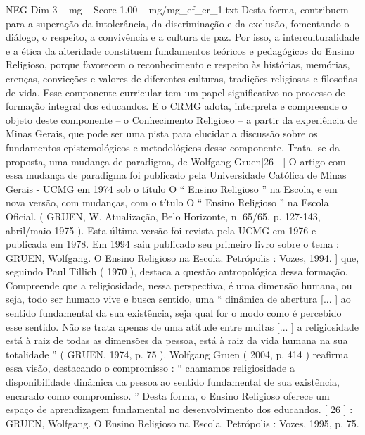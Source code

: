 \begin{textsample}{NEG Dim 3 – mg – Score 1.00 – mg/mg\_ef\_er\_1.txt}
Desta forma, contribuem para a superação da intolerância, da discriminação e da exclusão, fomentando o diálogo, o respeito, a convivência e a cultura de paz.
Por isso, a interculturalidade e a ética da alteridade constituem fundamentos teóricos e pedagógicos do Ensino Religioso, porque favorecem o reconhecimento e respeito às histórias, memórias, crenças, convicções e valores de diferentes culturas, tradições religiosas e filosofias de vida.
Esse componente curricular tem um papel significativo no processo de formação integral dos educandos.
E o CRMG adota, interpreta e compreende o objeto deste componente – o Conhecimento Religioso – a partir da experiência de Minas Gerais, que pode ser uma pista para elucidar a discussão sobre os fundamentos epistemológicos e metodológicos desse componente.
Trata -se da proposta, uma mudança de paradigma, de Wolfgang Gruen[26 ] [ O artigo com essa mudança de paradigma foi publicado pela Universidade Católica de Minas Gerais - UCMG em 1974 sob o título O “ Ensino Religioso ” na Escola, e em nova versão, com mudanças, com o título O “ Ensino Religioso ” na Escola Oficial. ( GRUEN, W.
Atualização, Belo Horizonte, n. 65/65, p. 127-143, abril/maio 1975 ).
Esta última versão foi revista pela UCMG em 1976 e publicada em 1978.
Em 1994 saiu publicado seu primeiro livro sobre o tema : GRUEN, Wolfgang.
O Ensino Religioso na Escola.
Petrópolis : Vozes, 1994. ] que, seguindo Paul Tillich ( 1970 ), destaca a questão antropológica dessa formação.
Compreende que a religiosidade, nessa perspectiva, é uma dimensão humana, ou seja, todo ser humano vive e busca sentido, uma “ dinâmica de abertura [... ] ao sentido fundamental da sua existência, seja qual for o modo como é percebido esse sentido.
Não se trata apenas de uma atitude entre muitas [... ] a religiosidade está à raiz de todas as dimensões da pessoa, está à raiz da vida humana na sua totalidade ” ( GRUEN, 1974, p. 75 ).
Wolfgang Gruen ( 2004, p. 414 ) reafirma essa visão, destacando o compromisso : “ chamamos religiosidade a disponibilidade dinâmica da pessoa ao sentido fundamental de sua existência, encarado como compromisso. ” Desta forma, o Ensino Religioso oferece um espaço de aprendizagem fundamental no desenvolvimento dos educandos. [ 26 ] : GRUEN, Wolfgang.
O Ensino Religioso na Escola.
Petrópolis : Vozes, 1995, p. 75.

\end{textsample}
